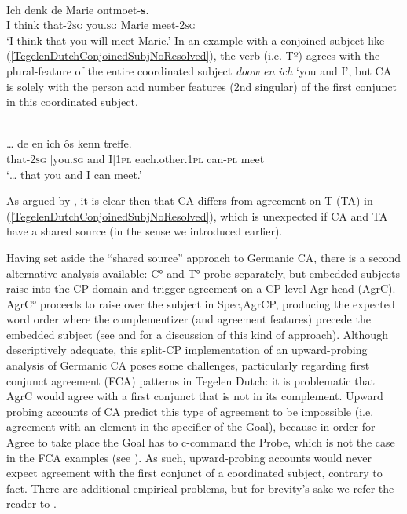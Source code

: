 \documentclass[output=paper
,modfonts
,nonflat
]{langsci/langscibook}
\begin{document}
\ea \label{TegelenDutchConjoinedSubj}
 \\
\gll Ich denk de  Marie ontmoet-\textbf{s}.\\
I think that-2\textsc{sg} you.\textsc{sg} Marie meet-2\textsc{sg} \\
\glt `I think that you will meet Marie.'		
\z
\noindent In an example with a conjoined subject like (\ref{TegelenDutchConjoinedSubjNoResolved}), the verb (i.e. Tº) agrees with the plural-feature of the entire coordinated subject \textit{doow en ich} `you and I', but CA is solely with the person and number features (2nd singular) of the first conjunct in this coordinated subject.

\ea \label{TegelenDutchConjoinedSubjNoResolved}
 \\
\gll … de  en ich ôs kenn treffe.\\
{} that-2\textsc{sg} [you.\textsc{sg} and I]1\textsc{pl} each.other.1\textsc{pl} can-\textsc{pl} meet \\
\glt `… that you and I can meet.'										
\z

\noindent As argued by \citeauthor{Haegeman:2012}, it is clear then that CA differs from agreement on T (TA) in (\ref{TegelenDutchConjoinedSubjNoResolved}), which is unexpected if CA and TA have a shared source (in the sense we introduced earlier). 

Having set aside the ``shared source'' approach to Germanic CA, there is a second alternative analysis available: C° and T° probe separately, but embedded subjects raise into the CP-domain and trigger agreement on a CP-level Agr head (AgrC). AgrC° proceeds to raise over the subject in Spec,AgrCP, producing the expected word order where the complementizer (and agreement features) precede the embedded subject (see \citealt{Shlonsky:1994} and \citealt{Zwart:1993} for a discussion of this kind of approach). Although descriptively adequate, this split-CP implementation of an upward-probing analysis of Germanic CA poses some challenges, particularly regarding first conjunct agreement (FCA) patterns in Tegelen Dutch: it is problematic that AgrC would agree with a first conjunct that is not in its complement. Upward probing accounts of CA predict this type of agreement to be impossible (i.e. agreement with an element in the specifier of the Goal), because in order for Agree to take place the Goal has to c-command the Probe, which is not the case in the FCA examples (see \citealt{Baker:2008,Zeijlstra:2012,Wurmbrand:2011}). As such, upward-probing accounts would never expect agreement with the first conjunct of a coordinated subject, contrary to fact. There are additional empirical problems, but for brevity's sake we refer the reader to \citet{vanKoppen:2005,vanKoppen:2017}.
\end{document}
